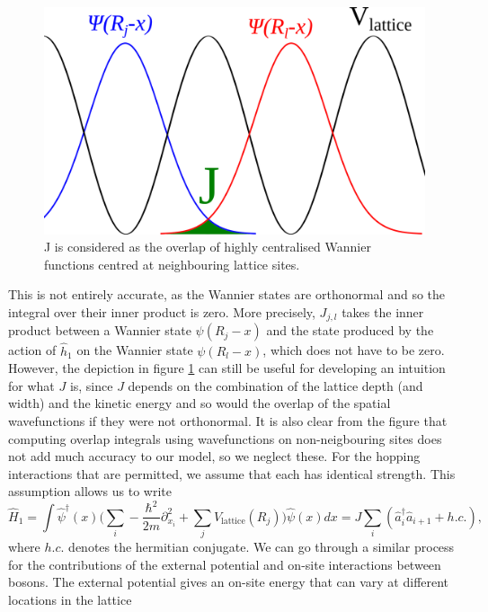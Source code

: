\documentclass[a4paper,10pt]{article}
\begin{document}
\begin{figure}[H]
 \begin{center}
   \includegraphics[width=\textwidth]{J_overlap_drawing}
 \end{center}
 \label{J_overlap_drawing}
 \caption{J is considered as the overlap of highly centralised Wannier functions centred at neighbouring lattice sites.}
 \end{figure}

This is not entirely accurate, as the Wannier states are orthonormal and so the integral over their inner product is zero. More precisely, $J_{j,l}$ takes the inner product between a Wannier state
$\psi(R_j-x)$ and the state produced by the action of $\hat{h}_1$ on the Wannier state $\psi(R_l-x)$, which does not have to be zero. However, the depiction in figure \ref{J_overlap_drawing} can still
be useful for developing an intuition for what $J$ is, since $J$ depends on the combination of the lattice depth (and width) and the kinetic energy and so would the overlap of the spatial wavefunctions
if they were not orthonormal. It is also clear from the figure that computing overlap integrals using wavefunctions on non-neigbouring sites does not add much accuracy to our model, so we neglect these.
For the hopping interactions that are permitted, we assume that each has identical strength. This assumption allows us to write
\begin{equation}
 \hat{H}_1=\int  \hat{\psi}^{\dagger}(x) \bigg(  \sum_{i}-\frac{\hbar^{2}}{2m}  \partial_{x_{i}}^2+\sum_{j}V_{\text{lattice}}(R_{j})  \bigg)    \hat{\psi}(x)dx=J\sum_{i}(\hat{a}^\dagger_{i}\hat{a}_{i+1}+h.c.),
\end{equation}
where $h.c.$ denotes the hermitian conjugate.
We can go through a similar process for the contributions of the external potential and on-site interactions between bosons. The external potential gives an on-site energy that can vary
at different locations in the lattice
\end{document}
